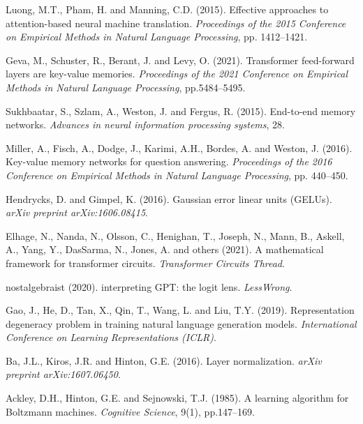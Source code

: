\documentclass[11pt,a4paper]{article}
\begin{document}
\begin{thebibliography}{}
		Luong, M.T., Pham, H. and Manning, C.D. (2015).
		Effective approaches to attention-based neural machine translation.
		\textit{Proceedings of the 2015 Conference on Empirical Methods in Natural Language Processing}, pp. 1412--1421.
		
		Geva, M., Schuster, R., Berant, J. and Levy, O. (2021).
		Transformer feed-forward layers are key-value memories.
		\textit{Proceedings of the 2021 Conference on Empirical Methods in Natural Language Processing}, pp.5484--5495.
		
		Sukhbaatar, S., Szlam, A., Weston, J. and Fergus, R. (2015).
		End-to-end memory networks.
		\textit{Advances in neural information processing systems}, 28.
		
		Miller, A., Fisch, A., Dodge, J., Karimi, A.H., Bordes, A. and Weston, J. (2016).
		Key-value memory networks for question answering.
		\textit{Proceedings of the 2016 Conference on Empirical Methods in Natural Language Processing}, pp. 440--450.
		
		Hendrycks, D. and Gimpel, K. (2016).
		Gaussian error linear units (GELUs).
		\textit{arXiv preprint arXiv:1606.08415}.
		
		Elhage, N., Nanda, N., Olsson, C., Henighan, T., Joseph, N., Mann, B., Askell, A., Yang, Y., DasSarma, N., Jones, A. and others (2021).
		A mathematical framework for transformer circuits.
		\textit{Transformer Circuits Thread}.
		
		nostalgebraist (2020).
		interpreting GPT: the logit lens.
		\textit{LessWrong}.
		
		Gao, J., He, D., Tan, X., Qin, T., Wang, L. and Liu, T.Y. (2019).
		Representation degeneracy problem in training natural language generation models.
		\textit{International Conference on Learning Representations (ICLR)}.
		
		Ba, J.L., Kiros, J.R. and Hinton, G.E. (2016).
		Layer normalization.
		\textit{arXiv preprint arXiv:1607.06450}.
		
		Ackley, D.H., Hinton, G.E. and Sejnowski, T.J. (1985).
		A learning algorithm for Boltzmann machines.
		\textit{Cognitive Science}, 9(1), pp.147--169.
		

\end{thebibliography}
\end{document}
